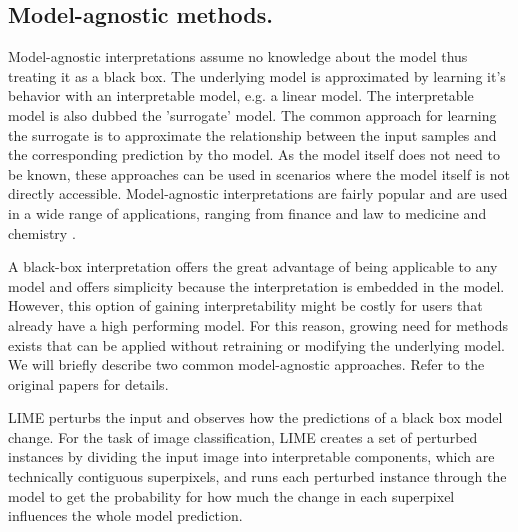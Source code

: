 
\subsection{Model-agnostic methods.}
\label{subsec:bb_methods}

Model-agnostic interpretations assume no knowledge about the model thus treating it as a black box. The underlying model is approximated by learning it's behavior with an interpretable model, e.g. a linear model. The interpretable model is also dubbed the 'surrogate' model. The common approach for learning the surrogate is to approximate the relationship between the input samples and the corresponding prediction by tho model.
As the model itself does not need to be known, these approaches can be used in scenarios where the model itself is not directly accessible. Model-agnostic interpretations are fairly popular and are used in a wide range of applications, ranging from finance and law to medicine and chemistry \cite{elshawi2019interpretability, whitmore2016mapping}. 

A black-box interpretation offers the great advantage of being applicable to any model and offers simplicity because the interpretation is embedded in the model. However, this option of gaining interpretability might be costly for users that already have a high performing model. For this reason, growing need for methods exists that can be applied without retraining or modifying the underlying model.
We will briefly describe two common model-agnostic approaches. Refer to the original papers for details.

\newline
LIME \cite{ribeiro2016should} perturbs the input and observes how the predictions of a black box model change. For the task of image classification, LIME creates a set of perturbed instances by dividing the input image into interpretable components, which are technically contiguous superpixels, and runs each perturbed instance through the model to get the probability for how much the change in each superpixel influences the whole model prediction. 

